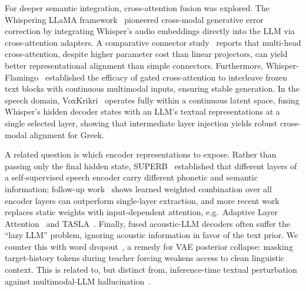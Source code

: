 \documentclass{article}
\begin{document}
For deeper semantic integration, cross-attention fusion was explored. The Whispering LLaMA framework~\cite{Radhakrishnan_2023} pioneered cross-modal generative error correction by integrating Whisper's audio embeddings directly into the LLM via cross-attention adapters. A comparative connector study~\cite{yu2023connectingspeechencoderlarge} reports that multi-head cross-attention, despite higher parameter cost than linear projectors, can yield better representational alignment than simple connectors. Furthermore, Whisper-Flamingo~\cite{rouditchenko2024whisperflamingointegratingvisualfeatures} established the efficacy of gated cross-attention to interleave frozen text blocks with continuous multimodal inputs, ensuring stable generation. In the speech domain, VoxKrikri~\cite{damianos2025voxkrikriunifyingspeechlanguage} operates fully within a continuous latent space, fusing Whisper's hidden decoder states with an LLM's textual representations at a single selected layer, showing that intermediate layer injection yields robust cross-modal alignment for Greek.

A related question is which encoder representations to expose. Rather than passing only the final hidden state, SUPERB~\cite{yang2021superbspeechprocessinguniversal} established that different layers of a self-supervised speech encoder carry different phonetic and semantic information; follow-up work~\cite{chiu24_interspeech} shows learned weighted combination over all encoder layers can outperform single-layer extraction, and more recent work replaces static weights with input-dependent attention, e.g.\ Adaptive Layer Attention~\cite{tripathi2025listenliketeachermitigating} and TASLA~\cite{hsu2025taslatextalignedspeechtokens}. Finally, fused acoustic-LLM decoders often suffer the ``lazy LLM'' problem, ignoring acoustic information in favor of the text prior. We counter this with word dropout~\cite{bowman2016}, a remedy for VAE posterior collapse: masking target-history tokens during teacher forcing weakens access to clean linguistic context. This is related to, but distinct from, inference-time textual perturbation against multimodal-LLM hallucination~\cite{jia2026decodingperturbationmitigatingmllm}.
\end{document}
